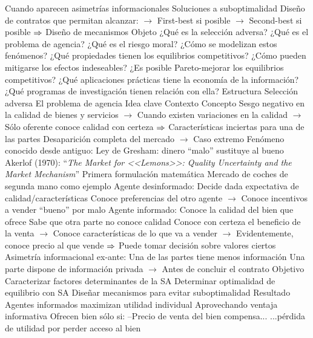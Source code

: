 \documentclass{nuevotema}
\begin{document}
\begin{esquemal}
				\4[] Cuando aparecen asimetrías informacionales
				\4 Soluciones a suboptimalidad
				\4[] Diseño de contratos que permitan alcanzar:
				\4[] $\to$ First-best si posible
				\4[] $\to$ Second-best si posible
				\4[] $\Rightarrow$ Diseño de mecanismos
		\2 Objeto
			\3 ¿Qué es la selección adversa?
			\3 ¿Qué es el problema de agencia?
			\3 ¿Qué es el riesgo moral?
			\3 ¿Cómo se modelizan estos fenómenos?
			\3 ¿Qué propiedades tienen los equilibrios competitivos?
			\3 ¿Cómo pueden mitigarse los efectos indeseables?
			\3 ¿Es posible Pareto-mejorar los equilibrios competitivos?
			\3 ¿Qué aplicaciones prácticas tiene la economía de la información?
			\3 ¿Qué programas de investigación tienen relación con ella?
		\2 Estructura
			\3 Selección adversa
			\3 El problema de agencia
	\1 
		\2 Idea clave
			\3 Contexto
				\4 Concepto
				\4[] Sesgo negativo en la calidad de bienes y servicios
				\4[] $\to$ Cuando existen variaciones en la calidad
				\4[] $\to$ Sólo oferente conoce calidad con certeza
				\4[] $\Rightarrow$ Características inciertas para una de las partes
				\4[] Desaparición completa del mercado
				\4[] $\to$ Caso extremo
				\4 Fenómeno conocido desde antiguo:
				\4[] Ley de Gresham: dinero ``malo'' sustituye al bueno
				\4 Akerlof (1970):
				\4[] ``\textit{The Market for <<Lemons>>: Quality Uncertainty and the Market Mechanism}''
				\4[] Primera formulación matemática
				\4[] Mercado de coches de segunda mano como ejemplo
				\4 Agente desinformado:
				\4[] Decide dada expectativa de calidad/características
				\4[] Conoce preferencias del otro agente
				\4[] $\to$ Conoce incentivos a vender ``bueno'' por malo
				\4 Agente informado:
				\4[] Conoce la calidad del bien que ofrece
				\4[] Sabe que otra parte no conoce calidad
				\4[] Conoce con certeza el beneficio de la venta
				\4[] $\to$ Conoce características de lo que va a vender
				\4[] $\to$ Evidentemente, conoce precio al que vende
				\4[] $\Rightarrow$ Puede tomar decisión sobre valores ciertos
				\4 Asimetría informacional ex-ante:
				\4[] Una de las partes tiene menos información
				\4[] Una parte dispone de información privada
				\4[] $\to$ Antes de concluir el contrato
			\3 Objetivo
				\4 Caracterizar factores determinantes de la SA
				\4 Determinar optimalidad de equilibrio con SA
				\4 Diseñar mecanismos para evitar suboptimalidad
			\3 Resultado
				\4 Agentes informados maximizan utilidad individual
				\4[] Aprovechando ventaja informativa
				\4[] Ofrecen bien sólo si:
				\4[] --Precio de venta del bien compensa...
				\4[] ...pérdida de utilidad por perder acceso al bien

\end{esquemal}
\end{document}
